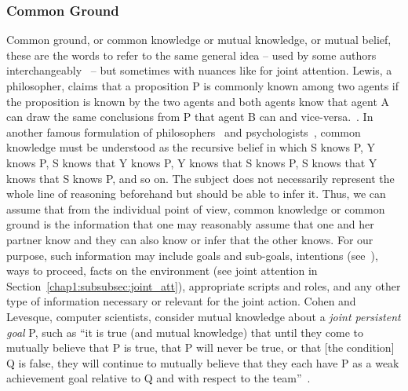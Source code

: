 \documentclass[a4paper,11pt,twoside]{StyleThese}
\begin{document}
\subsubsection{Common Ground}\label{chap1:subsubsec:common_g}
Common ground, or common knowledge or mutual knowledge, or mutual belief, these are the words to refer to the same general idea -- used by some authors interchangeably~\cite{clark_1992_arenas, clark_1996_using} -- but sometimes with nuances like for joint attention. Lewis, a philosopher, claims that a proposition P is commonly known among two agents if the proposition is known by the two agents and both agents know that agent A can draw the same conclusions from P that agent B can and vice-versa.~\cite{lewis_1969_convention}. In another famous formulation of philosophers~\cite{schiffer_1972_meaning} and psychologists~\cite{thomas_2014_psychology}, common knowledge must be understood as the recursive belief in which S knows P, Y knows P, S knows that Y knows P, Y knows that S knows P, S knows that Y knows that S knows P, and so on. The subject does not necessarily represent the whole line of reasoning beforehand but should be able to infer it. Thus, we can assume that from the individual point of view, common knowledge or common ground is the information that one may reasonably assume that one and her partner know and they can also know or infer that the other knows. For our purpose, such information may include goals and sub-goals, intentions (see~\cite{bratman_1992_coop}), ways to proceed, facts on the environment (see joint attention in Section~\ref{chap1:subsubsec:joint_att}), appropriate scripts and roles, and any other type of information necessary or relevant for the joint action. Cohen and Levesque, computer scientists, consider mutual knowledge about a \emph{joint persistent goal} P, such as ``it is true (and mutual knowledge) that until they come to mutually believe that P is true, that P will never be true, or that [the condition] Q is false, they will continue to mutually believe that they each have P as a weak achievement goal relative to Q and with respect to the team''~\cite[p.~499]{cohen_1991_teamwork}.
\end{document}

